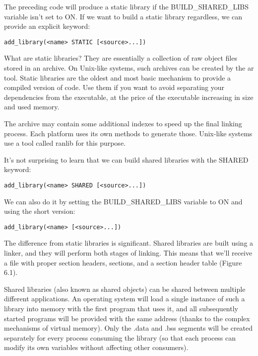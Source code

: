 The preceding code will produce a static library if the BUILD\_SHARED\_LIBS variable isn't set to ON. If we want to build a static library regardless, we can provide an explicit keyword:

\begin{lstlisting}[style=styleCMake]
add_library(<name> STATIC [<source>...])
\end{lstlisting}

What are static libraries? They are essentially a collection of raw object files stored in an archive. On Unix-like systems, such archives can be created by the ar tool. Static libraries are the oldest and most basic mechanism to provide a compiled version of code. Use them if you want to avoid separating your dependencies from the executable, at the price of the executable increasing in size and used memory.

The archive may contain some additional indexes to speed up the final linking process. Each platform uses its own methods to generate those. Unix-like systems use a tool called ranlib for this purpose.


It's not surprising to learn that we can build shared libraries with the SHARED keyword:

\begin{lstlisting}[style=styleCMake]
add_library(<name> SHARED [<source>...])
\end{lstlisting}

We can also do it by setting the BUILD\_SHARED\_LIBS variable to ON and using the
short version:

\begin{lstlisting}[style=styleCMake]
add_library(<name> [<source>...])
\end{lstlisting}

The difference from static libraries is significant. Shared libraries are built using a linker, and they will perform both stages of linking. This means that we'll receive a file with proper section headers, sections, and a section header table (Figure 6.1).

Shared libraries (also known as shared objects) can be shared between multiple different applications. An operating system will load a single instance of such a library into memory with the first program that uses it, and all subsequently started programs will be provided with the same address (thanks to the complex mechanisms of virtual memory). Only the .data and .bss segments will be created separately for every process consuming the library (so that each process can modify its own variables without affecting other consumers).

